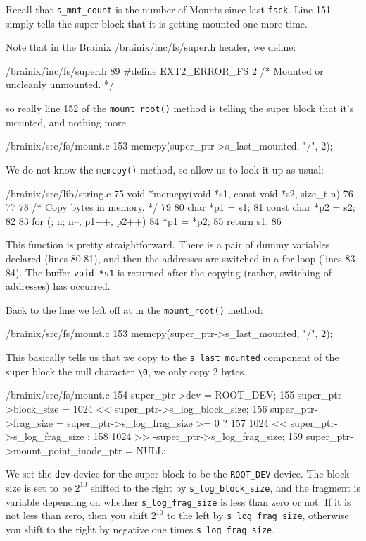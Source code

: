 Recall that \verb|s_mnt_count| is the number of Mounts since last \verb|fsck|. Line 151 simply tells the super block that it is getting mounted one more time.

Note that in the Brainix /brainix/inc/fs/super.h header, we define:
\begin{code}{/brainix/inc/fs/super.h}
89 #define EXT2_ERROR_FS		2 /* Mounted or uncleanly unmounted. */
\end{code}
so really line 152 of the \verb|mount_root()| method is telling the super block that it's mounted, and nothing more.

\begin{code}{/brainix/src/fs/mount.c}
153      memcpy(super_ptr->s_last_mounted, "/\0", 2);
\end{code}
We do not know the \verb|memcpy()| method, so allow us to look it up as usual: 
\begin{code}{/brainix/src/lib/string.c}
75 void *memcpy(void *s1, const void *s2, size_t n)
76 {
77
78 /* Copy bytes in memory. */
79 
80      char *p1 = s1;
81      const char *p2 = s2;
82 
83      for (; n; n--, p1++, p2++)
84           *p1 = *p2;
85      return s1;
86 }
\end{code}
This function is pretty straightforward. There is a pair of dummy variables declared (lines 80-81), and then the addresses are switched in a for-loop (lines 83-84). The buffer \verb|void *s1| is returned after the copying (rather, switching of addresses) has occurred.

Back to the line we left off at in the \verb|mount_root()| method:
\begin{code}{/brainix/src/fs/mount.c}
153      memcpy(super_ptr->s_last_mounted, "/\0", 2);
\end{code}
This basically tells us that we copy to the \verb|s_last_mounted| component of the super block the null character \verb|\0|, we only copy 2 bytes.

\begin{code}{/brainix/src/fs/mount.c}
154      super_ptr->dev = ROOT_DEV;
155      super_ptr->block_size = 1024 << super_ptr->s_log_block_size;
156      super_ptr->frag_size = super_ptr->s_log_frag_size >= 0 ?
157           1024 << super_ptr->s_log_frag_size :
158           1024 >> -super_ptr->s_log_frag_size;
159      super_ptr->mount_point_inode_ptr = NULL;
\end{code}
We set the \verb|dev| device for the super block to be the \verb|ROOT_DEV| device. The block size is set to be $2^{10}$ shifted to the right by \verb|s_log_block_size|, and the fragment is variable depending on whether \verb|s_log_frag_size| is less than zero or not. If it is not less than zero, then you shift $2^{10}$ to the left by \verb|s_log_frag_size|, otherwise you shift to the right by negative one times \verb|s_log_frag_size|.

